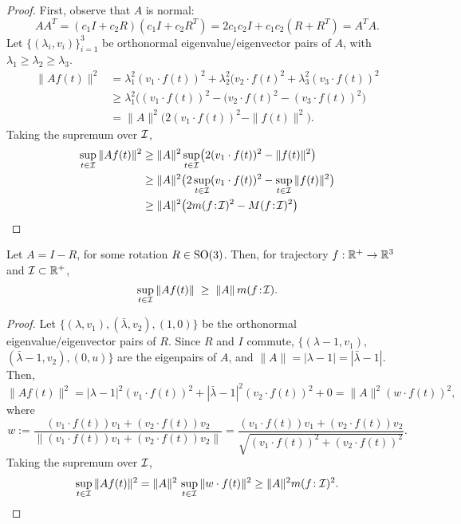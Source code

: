 \begin{proof}
First, observe that $A$ is normal:
$$AA^T = (c_1I + c_2R)(c_1I + c_2R^T) = 2c_1c_2I + c_1c_2(R + R^T)
= A^TA.$$
Let $\{(\lambda_i, v_i)\}_{i=1}^3$ be orthonormal eigenvalue/eigenvector pairs of $A$, with $\lambda_1\geq\lambda_2\geq\lambda_3$.
\begin{align*}
\|A f(t)\|^2 &= \lambda_1^2(v_1\cdot f(t))^2 + \lambda_2^2(v_2\cdot f(t)^2 + \lambda_3^2(v_3\cdot f(t))^2\\
&\geq \lambda_1^2\bigl((v_1\cdot f(t))^2 - (v_2\cdot f(t)^2 - (v_3\cdot f(t))^2\bigr)\\
&=\|A\|^2\bigl(2(v_1\cdot f(t))^2 - \|f(t)\|^2\bigr).
\end{align*}
Taking the supremum over $\mathcal{I}$,
\begin{align*}
\sup_{t\in\mathcal{I}}\|A f(t)\|^2 &\geq \|A\|^2\sup_{t\in\mathcal{I}}\bigl(2(v_1\cdot f(t))^2 - \|f(t)\|^2\bigr)\\
&\geq \|A\|^2\bigl(2\sup_{t\in\mathcal{I}}(v_1\cdot f(t))^2 - \sup_{t\in\mathcal{I}}\|f(t)\|^2\bigr)\\
&\geq \|A\|^2\bigl(2{m}(f\!:\!\mathcal{I})^2 - {M}(f\!:\!\mathcal{I})^2\bigr)
\end{align*}
\end{proof}

\begin{lemma}
Let $A = I-R$, for some rotation $R\in\operatorname{SO}(3)$.
Then, for trajectory $f:\mathbb{R}^+\to\mathbb{R}^3$ and $\mathcal{I}\subset\mathbb{R}^+$,
$$\sup_{t\in \mathcal{I}} \left\|A f(t)\right\| \;\geq\;
\left\|A\right\|{m}(f\!:\!\mathcal{I}).
$$
\end{lemma}
\begin{proof}
Let $\{(\lambda, v_1), (\bar\lambda, v_2), (1,0)\}$ be the orthonormal eigenvalue/eigenvector pairs of $R$.
Since $R$ and $I$ commute, $\{(\lambda-1, v_1),$ $(\bar\lambda-1, v_2), (0, u)\}$ are the eigenpairs of $A$, 
and $\|A\|=|\lambda-1| = |\bar\lambda-1|$. Then,
$$\|Af(t)\|^2 = |\lambda-1|^2(v_1\cdot f(t))^2 + |\bar\lambda-1|^2(v_2\cdot f(t))^2 + 0
= \|A\|^2(w\cdot f(t))^2,
$$
where 
$$w 
:= \frac{(v_1\cdot f(t)) v_1 + (v_2\cdot f(t)) v_2}{\|(v_1\cdot f(t)) v_1 + (v_2\cdot f(t)) v_2\|}
= \frac{(v_1\cdot f(t)) v_1 + (v_2\cdot f(t)) v_2}{\sqrt{(v_1\cdot f(t))^2 + (v_2\cdot f(t))^2}}.
$$
Taking the supremum over $\mathcal{I}$,
$$\sup_{t\in\mathcal{I}}\|Af(t)\|^2  = \|A\|^2\,\sup_{t\in\mathcal{I}}\|w\cdot f(t)\|^2 \geq \|A\|^2{m}(f\!:\mathcal{I})^2.$$
\end{proof}


